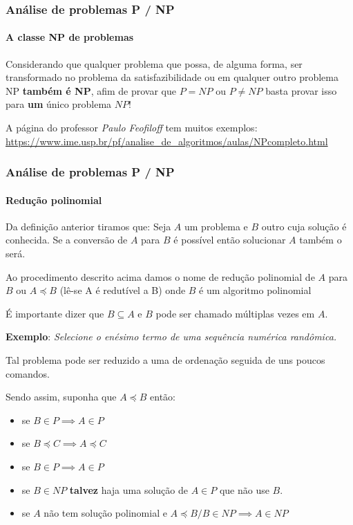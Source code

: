 \begin{frame}
	\frametitle{Análise de problemas P / NP}
	\framesubtitle{A classe NP de problemas}
	\par Considerando que qualquer problema que possa, de alguma forma, ser transformado no problema da satisfazibilidade ou em qualquer outro problema NP \textbf{também é NP}, afim de provar que $P=NP$ ou $P \neq NP$ basta provar isso para \textbf{um} único problema $NP$!
	\newline
	\par A página do professor \textit{Paulo Feofiloff} tem muitos exemplos:
	\href{https://www.ime.usp.br/~pf/analise_de_algoritmos/aulas/NPcompleto.html}{https://www.ime.usp.br/\texttildelow pf/analise\_de\_algoritmos/aulas/NPcompleto.html} 
\end{frame}

\begin{frame}
	\frametitle{Análise de problemas P / NP}
	\framesubtitle{Redução polinomial}
	\par Da definição anterior tiramos que: Seja $A$ um problema e $B$ outro cuja solução é conhecida. Se a conversão de $A$ para $B$ é possível então solucionar $A$ também o será.
	\par Ao procedimento descrito acima damos o nome de redução polinomial de $A$ para $B$ ou $A \preceq B$ (lê-se A é redutível a B) onde $B$ é um algoritmo polinomial
	\par É importante dizer que $B\subseteq A$ e $B$ pode ser chamado múltiplas vezes em $A$.\newline
	
	\par \textbf{Exemplo}: \textit{Selecione o enésimo termo de uma sequência numérica randômica.}
	\par Tal problema pode ser reduzido a uma de ordenação seguida de uns poucos comandos.	
	
	\par Sendo assim, suponha que $A \preceq B$ então:
	\begin{itemize}
		\item se $B \in P \implies A \in P$
		\item se $B \preceq C \implies A \preceq C$
		\item se $B \in P \implies A \in P$
		\item se $B \in NP$ \textbf{talvez} haja uma solução de $A \in P$ que não use $B$.
		\item se $A$ não tem solução polinomial e $A \preceq B / B \in NP \implies A \in NP$
	\end{itemize}
\end{frame}

